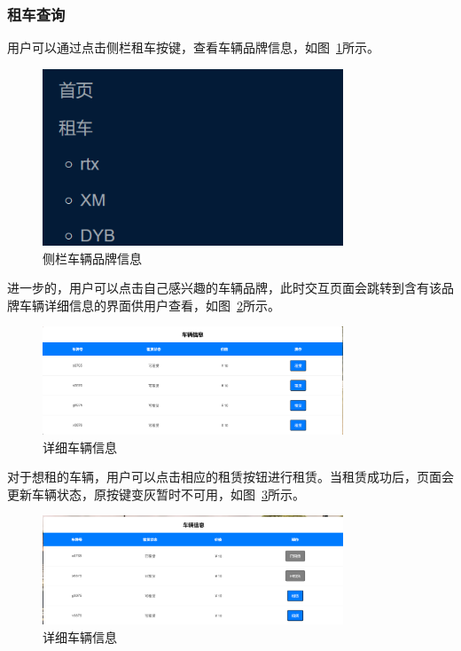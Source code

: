\documentclass[UTF8,a4paper,12pt]{ctexart}
\begin{document}
\subsubsection{租车查询}
用户可以通过点击侧栏租车按键，查看车辆品牌信息，如图~\ref{fig:br}所示。
\begin{figure}[htbp]  %
    \centering  %
    \includegraphics[width=0.8\textwidth]{pic/br.png}
    \caption{侧栏车辆品牌信息}  %
    \label{fig:br}  %
\end{figure}
进一步的，用户可以点击自己感兴趣的车辆品牌，此时交互页面会跳转到含有该品牌车辆详细信息的界面供用户查看，如图~\ref{fig:car}所示。
\begin{figure}[htbp]  %
    \centering  %
    \includegraphics[width=0.8\textwidth]{pic/car.png}
    \caption{详细车辆信息}  %
    \label{fig:car}  %
\end{figure}
对于想租的车辆，用户可以点击相应的租赁按钮进行租赁。当租赁成功后，页面会更新车辆状态，原按键变灰暂时不可用，如图~\ref{fig:rented}所示。
\begin{figure}[htbp]  %
    \centering  %
    \includegraphics[width=0.8\textwidth]{pic/rented.png}
    \caption{详细车辆信息}  %
    \label{fig:rented}  %
\end{figure}
\end{document}
